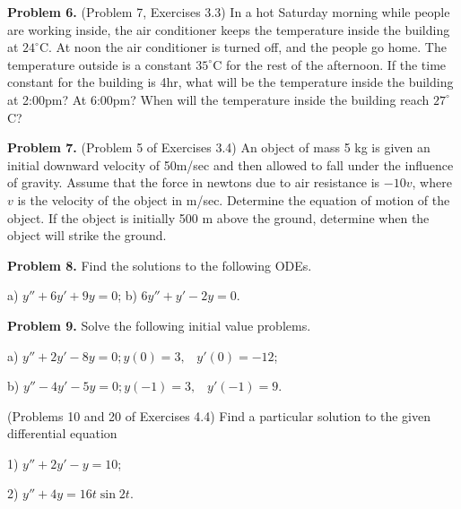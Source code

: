 \documentclass[11pt,a4paper]{article}
\begin{document}
\bigskip
\noindent
{\bf Problem 6.} (Problem 7, Exercises 3.3) In a hot Saturday morning while people are working inside, the air conditioner
keeps the temperature inside the building at $24^{\circ}$C. At noon the air conditioner is turned off, and the people
go home. The temperature outside is a constant $35^{\circ}$C for the rest of the afternoon. If the time constant for the building is 4hr, what will
be the temperature inside the building at 2:00pm? At 6:00pm? When will the
temperature inside the building reach $27^{\circ}$C?


\bigskip
\noindent
{\bf Problem 7.} (Problem 5 of Exercises 3.4) An object  of mass 5 kg is given an initial downward velocity of 50m/sec and then allowed to fall
under the influence of gravity. Assume that the force in newtons due to air resistance is $-10v$, where $v$ is
the velocity of the object in m/sec. Determine the equation of motion of the object. If the object is initially
500 m above the ground, determine when the object will strike the ground.

\bigskip
\noindent
{\bf Problem 8.}
Find the solutions to the following ODEs.

a) $y''+6y'+9y = 0$; \;\;\;\;\; b) $6y''+y'-2y = 0$.

\bigskip
\noindent
{\bf Problem 9.}
Solve the following initial value problems.

a) $y''+2y'-8y = 0 ; y(0)=3, \;\;\;y'(0)= -12$;

b) $y''-4y'-5y = 0 ; y(-1)= 3,\;\;\; y'(-1) = 9$.

 (Problems 10 and 20 of Exercises 4.4) Find a particular solution to the given
differential equation

1) $y'' + 2y' - y = 10$;

2) $y'' + 4y = 16t \sin 2t$.
\end{document}

